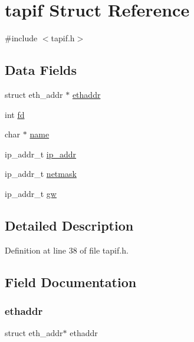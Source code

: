 \hypertarget{structtapif}{}\section{tapif Struct Reference}
\label{structtapif}


{\ttfamily \#include $<$tapif.\+h$>$}

\subsection*{Data Fields}
\begin{DoxyCompactItemize}
\item 
struct eth\+\_\+addr $\ast$ \hyperlink{structtapif_a0a7f8e58e2b9b7019402f3a9202c80a9}{ethaddr}
\item 
int \hyperlink{structtapif_a6f8059414f0228f0256115e024eeed4b}{fd}
\item 
char $\ast$ \hyperlink{structtapif_a5ac083a645d964373f022d03df4849c8}{name}
\item 
ip\+\_\+addr\+\_\+t \hyperlink{structtapif_a9e94eab4b5236fa02039f5e5c3a954ff}{ip\+\_\+addr}
\item 
ip\+\_\+addr\+\_\+t \hyperlink{structtapif_a5a6e0aa9b45e8b67ba88d750ab4e0537}{netmask}
\item 
ip\+\_\+addr\+\_\+t \hyperlink{structtapif_a539bd220ca3c77f244f067a64b88eedb}{gw}
\end{DoxyCompactItemize}


\subsection{Detailed Description}


Definition at line 38 of file tapif.\+h.



\subsection{Field Documentation}
\hypertarget{structtapif_a0a7f8e58e2b9b7019402f3a9202c80a9}{}\label{structtapif_a0a7f8e58e2b9b7019402f3a9202c80a9} 
\subsubsection{\texorpdfstring{ethaddr}{ethaddr}}
{\footnotesize\ttfamily struct eth\+\_\+addr$\ast$ ethaddr}



